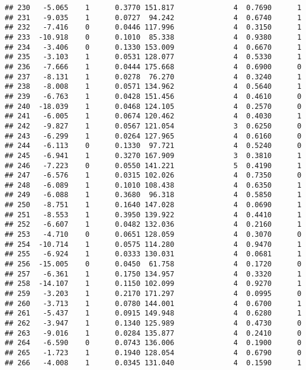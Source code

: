 \documentclass[
]{article}
\begin{document}
\begin{verbatim}
## 230   -5.065    1      0.3770 151.817              4  0.7690      1
## 231   -9.035    1      0.0727  94.242              4  0.6740      1
## 232   -7.416    0      0.0446 117.996              4  0.3150      1
## 233  -10.918    0      0.1010  85.338              4  0.9380      1
## 234   -3.406    0      0.1330 153.009              4  0.6670      1
## 235   -3.103    1      0.0531 128.077              4  0.5330      1
## 236   -7.666    1      0.0444 175.668              4  0.6900      0
## 237   -8.131    1      0.0278  76.270              4  0.3240      1
## 238   -8.008    1      0.0571 134.962              4  0.5640      1
## 239   -6.763    1      0.0428 151.456              4  0.4610      0
## 240  -18.039    1      0.0468 124.105              4  0.2570      0
## 241   -6.005    1      0.0674 120.462              4  0.4030      1
## 242   -9.827    1      0.0567 121.054              3  0.6250      0
## 243   -6.299    1      0.0264 127.965              4  0.6160      0
## 244   -6.113    0      0.1330  97.721              4  0.5240      0
## 245   -6.941    1      0.3270 167.909              3  0.3810      1
## 246   -7.223    0      0.0550 141.221              5  0.4190      1
## 247   -6.576    1      0.0315 102.026              4  0.7350      0
## 248   -6.089    1      0.1010 108.438              4  0.6350      1
## 249   -6.088    1      0.3680  96.318              4  0.5850      1
## 250   -8.751    1      0.1640 147.028              4  0.0690      1
## 251   -8.553    1      0.3950 139.922              4  0.4410      1
## 252   -6.607    1      0.0482 132.036              4  0.2160      1
## 253   -4.710    0      0.0651 128.059              4  0.3070      0
## 254  -10.714    1      0.0575 114.280              4  0.9470      1
## 255   -6.924    1      0.0333 130.031              4  0.0681      1
## 256  -15.005    0      0.0450  61.758              4  0.1720      0
## 257   -6.361    1      0.1750 134.957              4  0.3320      1
## 258  -14.107    1      0.1150 102.099              4  0.9270      1
## 259   -3.203    1      0.2170 171.297              4  0.0995      0
## 260   -3.713    1      0.0780 144.001              4  0.6700      1
## 261   -5.437    1      0.0915 149.948              4  0.6280      1
## 262   -3.947    1      0.1340 125.989              4  0.4730      0
## 263   -9.016    1      0.0284 135.877              4  0.2410      0
## 264   -6.590    0      0.0743 136.006              4  0.1900      0
## 265   -1.723    1      0.1940 128.054              4  0.6790      0
## 266   -4.008    1      0.0345 131.040              4  0.1590      1

\end{verbatim}
\end{document}
